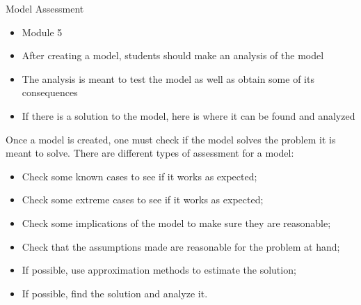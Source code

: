 \standardonlynewpage


%
%



\begin{module}{Model Assessment}
	\label{analysis}

\begin{siam}
	
	
\end{siam}

\end{module}




\begin{lesson}

	\begin{itemize}
		\item Module 5
	\end{itemize}

	\begin{itemize}
		\item After creating a model, students should make an analysis of the model
		\item The analysis is meant to test the model as well as obtain some of its consequences
		\item If there is a solution to the model, here is where it can be found and analyzed
	\end{itemize}
	


Once a model is created, one must check if the model solves the problem it is meant to solve.
There are different types of assessment for a model:
\begin{itemize}
	\item Check some known cases to see if it works as expected;
	\item Check some extreme cases to see if it works as expected;
	\item Check some implications of the model to make sure they are reasonable;
	\item Check that the assumptions made are reasonable for the problem at hand;
	\item If possible, use approximation methods to estimate the solution;
	\item If possible, find the solution and analyze it.
\end{itemize}



\end{lesson}
